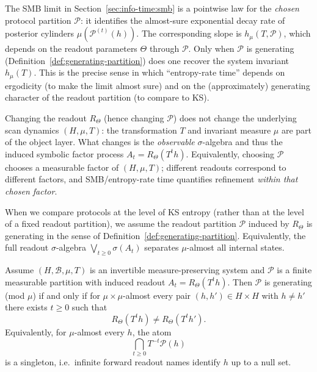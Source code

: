 \begin{remark}\label{rem:generating-consequence}
The SMB limit in Section~\ref{sec:info-time:smb} is a pointwise law for the \emph{chosen} protocol partition \(\mathcal{P}\): it identifies the almost-sure exponential decay rate of posterior cylinders \(\mu(\mathcal{P}^{(t)}(h))\).
The corresponding slope is \(h_\mu(T,\mathcal{P})\), which depends on the readout parameters \(\Theta\) through \(\mathcal{P}\).
Only when \(\mathcal{P}\) is generating (Definition~\ref{def:generating-partition}) does one recover the system invariant \(h_\mu(T)\).
This is the precise sense in which ``entropy-rate time'' depends on ergodicity (to make the limit almost sure) and on the (approximately) generating character of the readout partition (to compare to KS).
\end{remark}

\begin{remark}\label{rem:partition-does-not-change-dynamics}
Changing the readout \(R_\Theta\) (hence changing \(\mathcal{P}\)) does not change the underlying scan dynamics \((H,\mu,T)\): the transformation \(T\) and invariant measure \(\mu\) are part of the object layer.
What changes is the \emph{observable} \(\sigma\)-algebra and thus the induced symbolic factor process \(A_t=R_\Theta(T^t h)\).
Equivalently, choosing \(\mathcal{P}\) chooses a measurable factor of \((H,\mu,T)\); different readouts correspond to different factors, and SMB/entropy-rate time quantifies refinement \emph{within that chosen factor}.
\end{remark}

\begin{assumption}\label{assump:generating-readout}
When we compare protocols at the level of KS entropy (rather than at the level of a fixed readout partition), we assume the readout partition \(\mathcal{P}\) induced by \(R_\Theta\) is generating in the sense of Definition~\ref{def:generating-partition}.
Equivalently, the full readout \(\sigma\)-algebra \(\bigvee_{t\ge 0}\sigma(A_t)\) separates \(\mu\)-almost all internal states.
\end{assumption}

\begin{proposition}\label{prop:generator-orbit-separation}
Assume $(H,\mathcal{B},\mu,T)$ is an invertible measure-preserving system and $\mathcal{P}$ is a finite measurable partition with induced readout $A_t=R_\Theta(T^t h)$.
Then $\mathcal{P}$ is generating (mod $\mu$) if and only if for $\mu\times\mu$-almost every pair $(h,h')\in H\times H$ with $h\neq h'$ there exists $t\ge 0$ such that
\[
R_\Theta(T^t h)\neq R_\Theta(T^t h').
\]
Equivalently, for $\mu$-almost every $h$, the atom
\[
\bigcap_{t\ge 0} T^{-t}\mathcal{P}(h)
\]
is a singleton, i.e.\ infinite forward readout names identify $h$ up to a null set.
\cite{Walters1982,Petersen1983}
\end{proposition}

